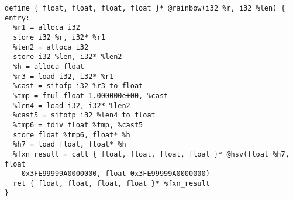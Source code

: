 \documentclass[main.tex]{subfiles}
\begin{document}
{\begin{lstlisting}
define { float, float, float, float }* @rainbow(i32 %r, i32 %len) {
entry:
  %r1 = alloca i32
  store i32 %r, i32* %r1
  %len2 = alloca i32
  store i32 %len, i32* %len2
  %h = alloca float
  %r3 = load i32, i32* %r1
  %cast = sitofp i32 %r3 to float
  %tmp = fmul float 1.000000e+00, %cast
  %len4 = load i32, i32* %len2
  %cast5 = sitofp i32 %len4 to float
  %tmp6 = fdiv float %tmp, %cast5
  store float %tmp6, float* %h
  %h7 = load float, float* %h
  %fxn_result = call { float, float, float, float }* @hsv(float %h7, float 
    0x3FE99999A0000000, float 0x3FE99999A0000000)
  ret { float, float, float, float }* %fxn_result
}
\end{lstlisting}
}
\end{document}
